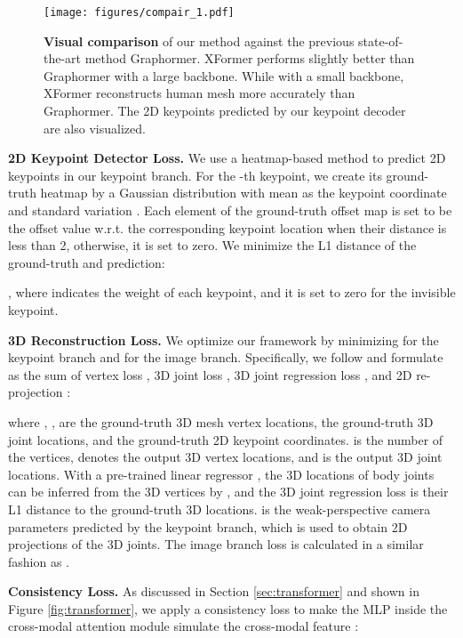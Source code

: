 \documentclass{article}
\newcommand\mypara[1]{\noindent\textbf{#1}}
\begin{document}
\begin{figure*}[t]
\centering
  \texttt{[image: figures/compair\_1.pdf]}
  \vspace{-5pt}
  \caption{\textbf{Visual comparison} of our method against the previous state-of-the-art method Graphormer. XFormer performs slightly better than Graphormer  with a large backbone. While with a small backbone, XFormer reconstructs human mesh more accurately than Graphormer. The 2D keypoints predicted by our keypoint decoder are also visualized.}
  \label{fig:compair}
  \vspace{-10pt}
\end{figure*}

\mypara{2D Keypoint Detector Loss.}
We use a heatmap-based method to predict 2D keypoints in our keypoint branch. For the -th keypoint, we create its ground-truth heatmap  by a Gaussian distribution with mean as the keypoint coordinate and standard variation . Each element of the ground-truth offset map  is set to be the offset value w.r.t. the corresponding keypoint location when their distance is less than 2, otherwise, it is set to zero.
We minimize the L1 distance of the ground-truth and prediction:

, where  indicates the weight of each keypoint, and it is set to zero for the invisible keypoint.

\mypara{3D Reconstruction Loss.}
We optimize our framework by minimizing  for the keypoint branch and  for the image branch. Specifically, we follow \cite{lin2020end} and formulate  as the sum of vertex loss , 3D joint loss , 3D joint regression loss , and 2D re-projection :




where , ,  are the ground-truth 3D mesh vertex locations, the ground-truth 3D joint locations, and the ground-truth 2D keypoint coordinates.  is the number of the vertices,  denotes the output 3D vertex locations, and  is the output 3D joint locations. With a pre-trained linear regressor , the 3D locations of body joints can be inferred from the 3D vertices by  \cite{SMPL:2015}, and the 3D joint regression loss  is their L1 distance to the ground-truth 3D locations.  is the weak-perspective camera parameters predicted by the keypoint branch, which is used to obtain 2D projections of the 3D joints. The image branch loss  is calculated in a similar fashion as .

\mypara{Consistency Loss.} As discussed in Section \ref{sec:transformer} and shown in Figure \ref{fig:transformer}, we apply a consistency loss  to make the MLP inside the cross-modal attention module simulate the cross-modal feature :
\end{document}
